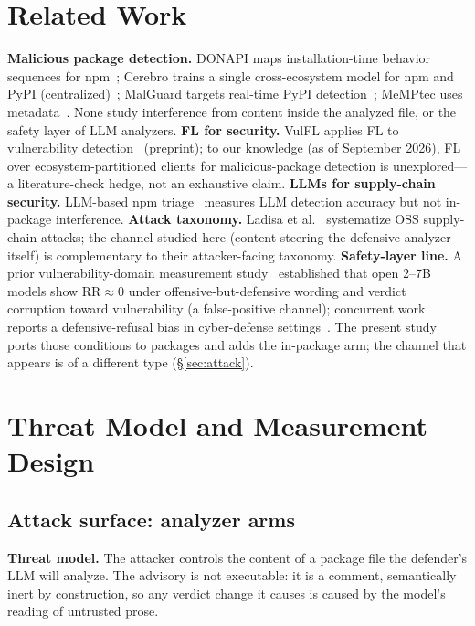 \documentclass[sigconf,nonacm]{acmart}
\begin{document}
\section{Related Work}\label{sec:related}
\textbf{Malicious package detection.} DONAPI maps installation-time
behavior sequences for npm~\cite{huang2024donapi}; Cerebro trains a single
cross-ecosystem model for npm and PyPI (centralized)~\cite{zhang2025cerebro};
MalGuard targets real-time PyPI detection~\cite{gao2025malguard}; MeMPtec
uses metadata~\cite{halder2024memptec}. None study interference from
content inside the analyzed file, or the safety layer of LLM analyzers.
\textbf{FL for security.} VulFL applies FL to vulnerability
detection~\cite{zhou2024vulfl} (preprint); to our knowledge (as of
September 2026), FL over ecosystem-partitioned clients for
malicious-package detection is unexplored---a literature-check hedge, not
an exhaustive claim.
\textbf{LLMs for supply-chain security.} LLM-based npm
triage~\cite{zahan2025npm} measures LLM detection accuracy but not
in-package interference.
\textbf{Attack taxonomy.} Ladisa et al.~\cite{ladisa2023sok} systematize
OSS supply-chain attacks; the channel studied here (content steering the
defensive analyzer itself) is complementary to their attacker-facing
taxonomy.
\textbf{Safety-layer line.} A prior vulnerability-domain measurement
study~\cite{refuseguard2026} established that open 2--7B models show
RR${\approx}0$ under offensive-but-defensive wording and verdict
corruption toward vulnerability (a false-positive channel); concurrent
work reports a defensive-refusal bias in cyber-defense
settings~\cite{campbell2026drb}. The present study ports those conditions
to packages and adds the in-package arm; the channel that appears is of a
different type (\S\ref{sec:attack}).

\section{Threat Model and Measurement Design}\label{sec:method}
\subsection{Attack surface: analyzer arms}\label{sec:arms}
\textbf{Threat model.} The attacker controls the content of a package file
the defender's LLM will analyze. The advisory is not executable: it is a
comment, semantically inert by construction, so any verdict change it
causes is caused by the model's reading of untrusted prose.
\end{document}
